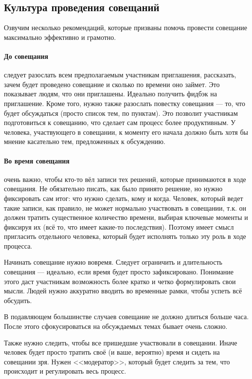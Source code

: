 \documentclass{../../text-style}
\begin{document}
\subsection{Культура проведения совещаний}

Озвучим несколько рекомендаций, которые призваны помочь провести совещание максимально эффективно и грамотно.

\paragraph*{До совещания} следует разослать всем предполагаемым участникам приглашения, рассказать, зачем будет проведено совещание и сколько по времени оно займет. Это показывает людям, что они приглашены. Идеально получить фидбэк на приглашение. Кроме того, нужно также разослать повестку совещания --- то, что будет обсуждаться (просто список тем, по пунктам). Это позволит участникам подготовиться к совещанию, что сделает сам процесс более продуктивным. У человека, участвующего в совещании, к моменту его начала должно быть хотя бы мнение касательно тем, предложенных к обсуждению.

\paragraph*{Во время совещания} очень важно, чтобы кто-то вёл записи тех решений, которые принимаются в ходе совещания. Не обязательно писать, как было принято решение, но нужно фиксировать сам итог: что нужно сделать, кому и когда. Человек, который ведет такие записи, как правило, не может нормально участвовать в совещании, т.к. он должен тратить существенное количество времени, выбирая ключевые моменты и фиксируя их (всё то, что имеет какие-то последствия). Поэтому имеет смысл пригласить отдельного человека, который будет исполнять только эту роль в ходе процесса.

Начинать совещание нужно вовремя. Следует ограничить и длительность совещания --- идеально, если время будет просто зафиксировано. Понимание этого даст участникам возможность более кратко и четко формулировать свои мысли. Людей нужно аккуратно вводить во временные рамки, чтобы успеть всё обсудить.

В подавляющем большинстве случаев совещание не должно длиться больше часа. После этого сфокусироваться на обсуждаемых темах бывает очень сложно.

Также нужно следить, чтобы все пришедшие участвовали в совещании. Иначе человек будет просто тратить своё (и ваше, вероятно) время и сидеть на совещании зря. Нужен <<модератор>>, который будет следить за тем, что происходит и регулировать весь процесс.
\end{document}
